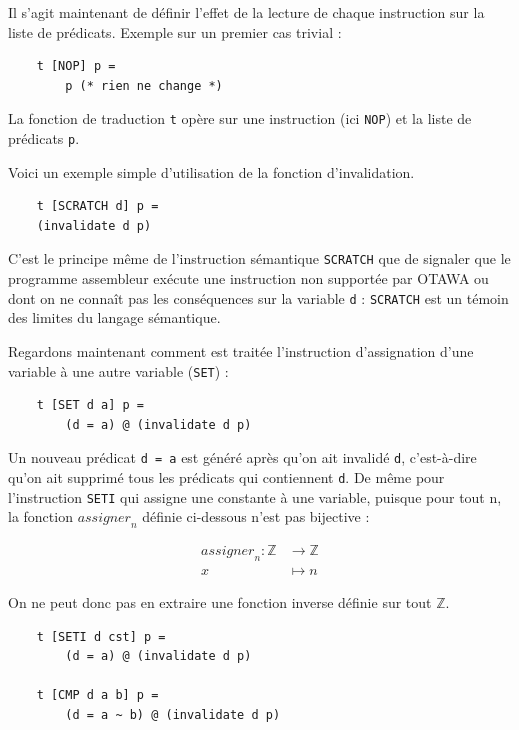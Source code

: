\documentclass[french]{article}
\begin{document}
  \bigbreak

  Il s'agit maintenant de définir l'effet de la lecture de chaque instruction sur la liste de prédicats.
  Exemple sur un premier cas trivial :

  \begin{lstlisting}
    t [NOP] p =
        p (* rien ne change *)
  \end{lstlisting}

  La fonction de traduction \texttt{t} opère sur une instruction (ici \texttt{NOP}) et la liste de prédicats \texttt{p}.

  Voici un exemple simple d'utilisation de la fonction d'invalidation.

  \begin{lstlisting}
    t [SCRATCH d] p =
	(invalidate d p)
  \end{lstlisting}

  C'est le principe même de l'instruction sémantique \texttt{SCRATCH} que de signaler que le programme assembleur exécute une instruction non supportée par OTAWA ou dont on ne connaît pas les conséquences sur la variable \texttt{d} : \texttt{SCRATCH} est un témoin des limites du langage sémantique.

  Regardons maintenant comment est traitée l'instruction d'assignation d'une variable à une autre variable (\texttt{SET}) :

  \begin{lstlisting}
    t [SET d a] p =
        (d = a) @ (invalidate d p)
  \end{lstlisting}

  Un nouveau prédicat \texttt{d = a} est généré après qu'on ait invalidé \texttt{d}, c'est-à-dire qu'on ait supprimé tous les prédicats qui contiennent \texttt{d}.
  De même pour l'instruction \texttt{SETI} qui assigne une constante à une variable, puisque pour tout n, la fonction $\textit{assigner}_n$ définie ci-dessous n'est pas bijective :

  \begin{align*}
    \textit{assigner}_n : \mathds{Z} &\rightarrow \mathds{Z}\\
    x &\mapsto n
  \end{align*}

  On ne peut donc pas en extraire une fonction inverse définie sur tout $\mathds{Z}$.

  \begin{lstlisting}
    t [SETI d cst] p =
        (d = a) @ (invalidate d p)

    t [CMP d a b] p =
        (d = a ~ b) @ (invalidate d p)
    \end{lstlisting}
\end{document}
